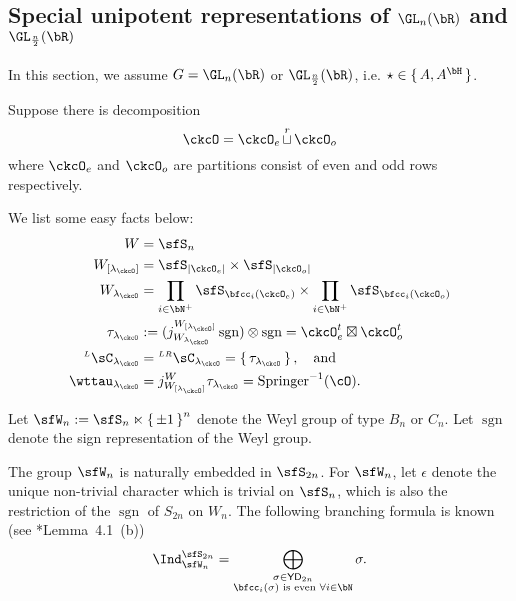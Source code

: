 \documentclass[12pt,a4paper]{amsart}
\def\abs#1{\left|{#1}\right|}
\newcommand{\sgn}{\operatorname{sgn}}
\def\DDD{{\check\nabla}}
\numberwithin{equation}{section}
\theoremstyle{remark}
\def\Irr{\mathrm{Irr}}
\def\ckGc{\check{G}_{\bC}}
\def\YD{\mathsf{YD}}
\def\lamck{\lambda_\ckcO}
\def\LC{{}^{\scriptscriptstyle L}\sC}
\def\LRC{{}^{\scriptscriptstyle LR}\sC}
\def\AND{\quad \text{and} \quad}
\def\cuprow{{\stackrel{r}{\sqcup}}}
\def\Spr{\mathrm{Springer}}
\def\cuprow{{\,\stackrel{r}{\sqcup}\,}}
\begin{document}
\subsection{Special unipotent representations of $\GL_n(\bR)$ and
  $\GL_{\frac{n}{2}}(\bR)$}
In this section, we assume $G = \GL_{n}(\bR)$ or $\GL_{\frac{n}{2}}(\bR)$, i.e.
$\star\in \set{A,A^{\bH}}$.


Suppose there is decomposition %
\[
  \ckcO = \ckcO_{e} \cuprow \ckcO_{o}
\]
where $\ckcO_e$ and $\ckcO_o$ are partitions consist of even and odd rows
respectively.

We list some easy facts below:
\[
  \begin{split}
    W &= \sfS_{n} \\
    W_{[\lamck]} & = \sfS_{\abs{\ckcO_{e}}}\times \sfS_{\abs{\ckcO_{o}}} \\
    W_{\lamck} & = \prod_{i\in \bN^{+}}\sfS_{\bfcc_{i}(\ckcO_{e})}\times \prod_{i\in \bN^{+}}\sfS_{\bfcc_{i}(\ckcO_{o})}\\\
    \tau_{\lamck} & := (j_{W_{\lamck}}^{W_{[\lamck]}}\sgn )\otimes \sgn =  \ckcO_{e}^{t}\boxtimes \ckcO_{o}^{t}\\
    \LC_{\lamck} & = \LRC_{\lamck}= \set{\tau_{\lamck}}, \AND \\
    \wttau_{\lamck} & = j_{W_{[\lamck]}}^{W}\tau_{\lamck} = \Spr^{-1}(\cO).
  \end{split}
\]










Let $\sfW_n := \sfS_n \ltimes \set{\pm 1}^n$ denote the Weyl group of type $B_n$
or $C_n$. Let $\sgn$ denote the sign representation of the Weyl group.

The group $\sfW_n$ is naturally embedded in $\sfS_{2n}$. For $\sfW_n$, let
$\epsilon$ denote the unique non-trivial character which is trivial on $\sfS_n$,
which is also the restriction of the $\sgn$ of $S_{2n}$ on $W_n$. The following
branching formula is known (see \cite{BV.W}*{Lemma~4.1~(b)})
\begin{equation}
  \Ind_{\sfW_{n}}^{\sfS_{2n}} = \bigoplus_{\substack{\sigma\in \YD_{2n}\\
      \bfcc_{i}(\sigma) \text{ is even } \forall i\in \bN}} \sigma.
\end{equation}
\end{document}
